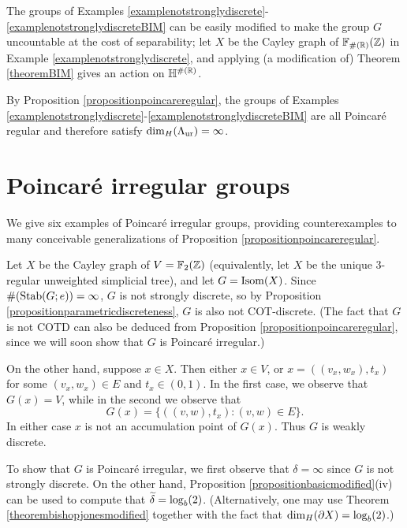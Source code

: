 \begin{remark}
\label{remarkMDuncountable}
The groups of Examples \ref{examplenotstronglydiscrete}-\ref{examplenotstronglydiscreteBIM} can be easily modified to make the group $G$ uncountable at the cost of separability; let $X$ be the Cayley graph of $\F_{\#(\R)}(\Z)$ in Example \ref{examplenotstronglydiscrete}, and applying (a modification of) Theorem \ref{theoremBIM} gives an action on $\H^{\#(\R)}$.
\end{remark}

\begin{remark*}
By Proposition \ref{propositionpoincareregular}, the groups of Examples \ref{examplenotstronglydiscrete}-\ref{examplenotstronglydiscreteBIM} are all Poincar\'e regular and therefore satisfy ${\dim_H}(\Lambda_{\mathrm{ur}}) = \infty$.
\end{remark*}

\section{Poincar\'e irregular groups}
\label{subsectionpoincareirregular}

We give six examples of Poincar\'e irregular groups, providing counterexamples to many conceivable generalizations of Proposition \ref{propositionpoincareregular}.


\begin{example}
\label{exampleAutT}
Let $X$ be the Cayley graph of $V = \F_2(\Z)$ (equivalently, let $X$ be the unique $3$-regular unweighted simplicial tree), and let $G = \operatorname{Isom}(X)$. Since $\#(\operatorname{Stab}(G;e)) = \infty$, $G$ is not strongly discrete, so by Proposition \ref{propositionparametricdiscreteness}, $G$ is also not COT-discrete. (The fact that $G$ is not COTD can also be deduced from Proposition \ref{propositionpoincareregular}, since we will soon show that $G$ is Poincar\'e irregular.)

On the other hand, suppose $x\in X$. Then either $x\in V$, or $x = ((v_x,w_x),t_x)$ for some $(v_x,w_x)\in E$ and $t_x\in (0,1)$. In the first case, we observe that $G(x) = V$, while in the second we observe that
\[
G(x) = \{((v,w),t_x) : (v,w)\in E\}.
\]
In either case $x$ is not an accumulation point of $G(x)$. Thus $G$ is weakly discrete.

To show that $G$ is Poincar\'e irregular, we first observe that $\delta = \infty$ since $G$ is not strongly discrete. On the other hand, Proposition \ref{propositionbasicmodified}(iv) can be used to compute that $\widetilde\delta = \log_b(2)$. (Alternatively, one may use Theorem \ref{theorembishopjonesmodified} together with the fact that ${\dim_H}(\partial X) = \log_b(2)$.)
\end{example}

